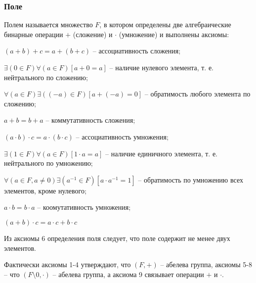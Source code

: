 \subsubsection{Поле}
\begin{opr}
Полем называется множество $F$, в котором определены две алгебраические бинарные операции $+$ (сложение) и $\cdot$ (умножение) и выполнены аксиомы:
\end{opr}

\begin{list}{.}{}

\item $(a+b)+c=a+(b+c)$ -- ассоциативность сложения;

\item $\exists(0\in F)\forall(a\in F)[a+0=a]$ -- наличие нулевого элемента, т. е. нейтрального по сложению;

\item $\forall(a\in F)\exists((-a)\in F)[a+(-a)=0]$ -- обратимость любого элемента по сложению;

\item $a+b=b+a$ -- коммутативность сложения;

\item $(a\cdot b)\cdot c = a\cdot (b\cdot c)$ -- ассоциативность умножения;

\item $\exists(1\in F)\forall(a\in F)[1 \cdot a=a]$ -- наличие единичного элемента, т. е. нейтрального по умножению;

\item $\forall(a\in F, a\neq 0)\exists(a^{-1}\in F)[a\cdot a^{-1} =1]$ -- обратимость по умножению всех элементов, кроме нулевого;
\item $a\cdot b = b\cdot a$ -- коомутативность умножения;
\item $(a+b)\cdot c= a\cdot c + b\cdot c$
\end{list}

\begin{zamech}
Из аксиомы 6 определения поля следует, что поле содержит не менее двух элементов.
\end{zamech}

\begin{zamech}
Фактически аксиомы 1-4 утверждают, что $(F,+)$ -- абелева группа, аксиомы 5-8 -- что $(F \setminus 0,\cdot)$ -- абелева группа, а аксиома 9 связывает операции $+$ и $\cdot$.
\end{zamech}

